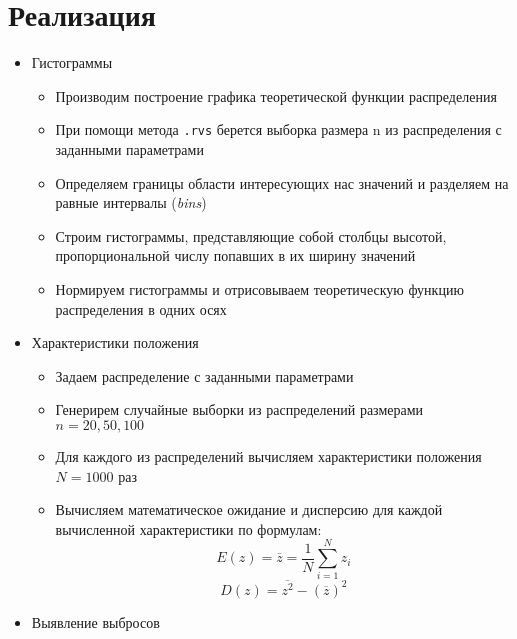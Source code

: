 \documentclass[12pt]{article}
\begin{document}
\section*{Реализация}
\begin{itemize}
	\item { Гистограммы
	\begin{itemize}
		\item Производим построение графика теоретической функции распределения
		\item При помощи метода \texttt{.rvs} берется выборка размера n из распределения с заданными параметрами
		\item Определяем границы области интересующих нас значений и разделяем на равные интервалы (\textit{bins})
		\item Строим гистограммы, представляющие собой столбцы высотой, пропорциональной числу попавших в их ширину значений
		\item Нормируем гистограммы и отрисовываем теоретическую функцию распределения в одних осях  
	\end{itemize} }
	\item {Характеристики положения
	\begin{itemize}
	    \item Задаем распределение с заданными параметрами 
	    \item Генерирем случайные выборки из распределений размерами $n = 20, 50, 100$
	    \item Для каждого из распределений вычисляем характеристики положения $N = 1000$ раз
	    \item Вычисляем математическое ожидание и дисперсию для каждой вычисленной характеристики по формулам:
	    \begin{equation}
	    \label{moment:1}
	      E(z) = \overline{z} = \frac{1}{N}\sum_{i=1}^{N}{z_i}
	    \end{equation}
	    \begin{equation}
	    \label{moment:2}
	      D(z) = \overline{z^2} - (\overline{z})^2
	    \end{equation}
	\end{itemize}}
	\item {Выявление выбросов
	\begin{itemize}

\end{itemize}}
\end{itemize}
\end{document}
